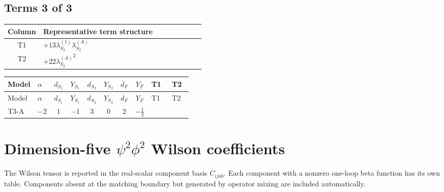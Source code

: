 \documentclass[8pt]{article}
\begin{document}
\begin{landscape}
\subsection*{Terms 3 of 3}
\begin{center}
\begin{tabular}{@{}c >{\raggedright\arraybackslash}p{0.82\linewidth}@{}}
\toprule
Column & Representative term structure \\
\midrule
T1 & \(\displaystyle +13 {\lambda_{S_2}^{(1)}} {\lambda_{S_2}^{(A)}}\) \\
\midrule
T2 & \(\displaystyle +22 {\lambda_{S_2}^{(A)}}^2\) \\
\midrule
\bottomrule
\end{tabular}
\end{center}
\smallskip
\tiny
\begin{longtable}{@{}llcccccc >{\raggedright\arraybackslash}p{0.21\linewidth} >{\raggedright\arraybackslash}p{0.21\linewidth}@{}}
\toprule
Model & $\alpha$ & $d_{S_1}$ & $Y_{S_1}$ & $d_{S_2}$ & $Y_{S_2}$ & $d_F$ & $Y_F$ & T1 & T2 \\
\midrule
\endfirsthead
\toprule
Model & $\alpha$ & $d_{S_1}$ & $Y_{S_1}$ & $d_{S_2}$ & $Y_{S_2}$ & $d_F$ & $Y_F$ & T1 & T2 \\
\midrule
\endhead
T3-A & $-2$ & $1$ & $-1$ & $3$ & $0$ & $2$ & $-\frac{1}{2}$ & \scriptsize\adjustbox{max width=\linewidth}{$\begin{gathered} +13 {\lambda_{S_2}^{(1)}} {\lambda_{S_2}^{(A)}}\end{gathered}$} & \scriptsize\adjustbox{max width=\linewidth}{$\begin{gathered} +22 {\lambda_{S_2}^{(A)}}^2\end{gathered}$} \\
\midrule
\bottomrule
\end{longtable}
\clearpage
\section*{Dimension-five $\psi^2\phi^2$ Wilson coefficients}
The Wilson tensor is reported in the real-scalar component basis $C_{ijab}$. Each component with a nonzero one-loop beta function has its own table. Components absent at the matching boundary but generated by operator mixing are included automatically.

\end{landscape}
\end{document}
